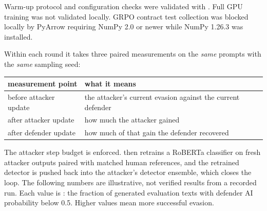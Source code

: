 Warm-up protocol and configuration checks were validated with
\texttt{}.
Full GPU training was not validated locally. GRPO contract test
collection was blocked locally by PyArrow requiring NumPy 2.0 or newer
while NumPy 1.26.3 was installed.

Within each round it takes three paired measurements on the \emph{same}
prompts with the \emph{same} sampling seed:

{\scriptsize\setlength{\tabcolsep}{3pt} %
\begin{longtable}[]{@{}
  >{\raggedright\arraybackslash}p{}
  >{\raggedright\arraybackslash}p{}@{}}
\toprule\noalign{}
\begin{minipage}[b]{\linewidth}\raggedright
measurement point
\end{minipage} & \begin{minipage}[b]{\linewidth}\raggedright
what it means
\end{minipage} \\
\midrule\noalign{}
\endhead
\bottomrule\noalign{}
\endlastfoot
before attacker update & the attacker's current evasion against the
current defender \\
after attacker update & how much the attacker gained \\
after defender update & how much of that gain the defender recovered \\
\end{longtable}
}

The attacker step budget is enforced.
\texttt{} then retrains a RoBERTa
classifier on fresh attacker outputs paired with matched human
references, and the retrained detector is pushed back into the
attacker's detector ensemble, which closes the loop. The following
numbers are illustrative, not verified results from a recorded run. Each
value is \texttt{}: the fraction of
generated evaluation texts with defender AI probability below 0.5.
Higher values mean more successful evasion.

